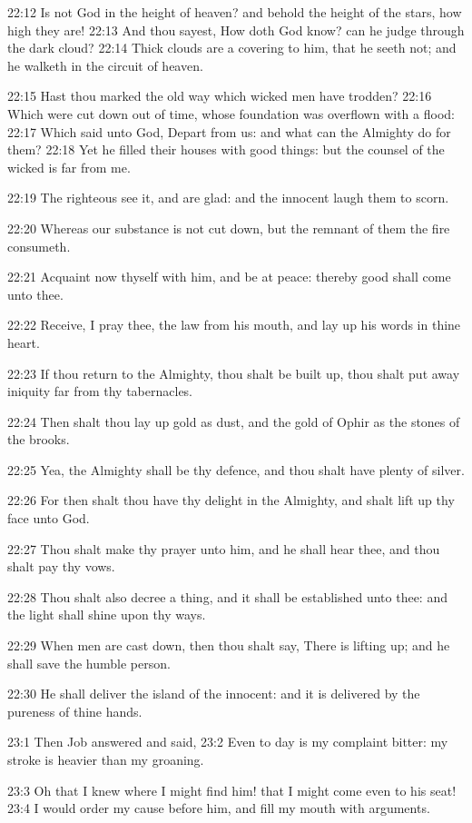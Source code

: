 22:12 Is not God in the height of heaven? and behold the height of the stars, how high they are!  22:13 And thou sayest, How doth God know?  can he judge through the dark cloud?  22:14 Thick clouds are a covering to him, that he seeth not; and he walketh in the circuit of heaven.

22:15 Hast thou marked the old way which wicked men have trodden?  22:16 Which were cut down out of time, whose foundation was overflown with a flood: 22:17 Which said unto God, Depart from us: and what can the Almighty do for them?  22:18 Yet he filled their houses with good things: but the counsel of the wicked is far from me.

22:19 The righteous see it, and are glad: and the innocent laugh them to scorn.

22:20 Whereas our substance is not cut down, but the remnant of them the fire consumeth.

22:21 Acquaint now thyself with him, and be at peace: thereby good shall come unto thee.

22:22 Receive, I pray thee, the law from his mouth, and lay up his words in thine heart.

22:23 If thou return to the Almighty, thou shalt be built up, thou shalt put away iniquity far from thy tabernacles.

22:24 Then shalt thou lay up gold as dust, and the gold of Ophir as the stones of the brooks.

22:25 Yea, the Almighty shall be thy defence, and thou shalt have plenty of silver.

22:26 For then shalt thou have thy delight in the Almighty, and shalt lift up thy face unto God.

22:27 Thou shalt make thy prayer unto him, and he shall hear thee, and thou shalt pay thy vows.

22:28 Thou shalt also decree a thing, and it shall be established unto thee: and the light shall shine upon thy ways.

22:29 When men are cast down, then thou shalt say, There is lifting up; and he shall save the humble person.

22:30 He shall deliver the island of the innocent: and it is delivered by the pureness of thine hands.

23:1 Then Job answered and said, 23:2 Even to day is my complaint bitter: my stroke is heavier than my groaning.

23:3 Oh that I knew where I might find him! that I might come even to his seat!  23:4 I would order my cause before him, and fill my mouth with arguments.

